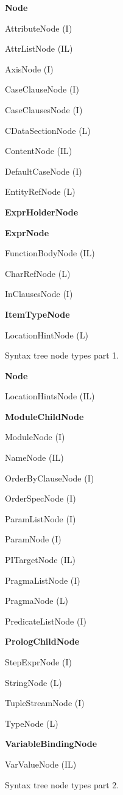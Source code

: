 \begin{figure}
\caption{Syntax tree node types part 1.}
\label{FIG_syntax_tree_node_types_part_1}
\begin{description}
\item \textbf{Node}
\begin{description}
\item AttributeNode (I)
\item AttrListNode (IL)
\item AxisNode (I)
\item CaseClauseNode (I)
\item CaseClausesNode (I)
\item CDataSectionNode (L)
\item ContentNode (IL)
\item DefaultCaseNode (I)
\item EntityRefNode (L)
\item \textbf{ExprHolderNode}
\item \textbf{ExprNode}
\item FunctionBodyNode (IL)
\item CharRefNode (L)
\item InClausesNode (I)
\item \textbf{ItemTypeNode}
\item LocationHintNode (L)
\end{description}
\end{description}
\end{figure}

\begin{figure}
\caption{Syntax tree node types part 2.}
\label{FIG_syntax_tree_node_types_part_2}
\begin{description}
\item \textbf{Node}
\begin{description}
\item LocationHintsNode (IL)
\item \textbf{ModuleChildNode}
\item ModuleNode (I)
\item NameNode (IL)
\item OrderByClauseNode (I)
\item OrderSpecNode (I)
\item ParamListNode (I)
\item ParamNode (I)
\item PITargetNode (IL)
\item PragmaListNode (I)
\item PragmaNode (L)
\item PredicateListNode (I)
\item \textbf{PrologChildNode}
\item StepExprNode (I)
\item StringNode (L)
\item TupleStreamNode (I)
\item TypeNode (L)
\item \textbf{VariableBindingNode}
\item VarValueNode (IL)
\end{description}
\end{description}
\end{figure}

